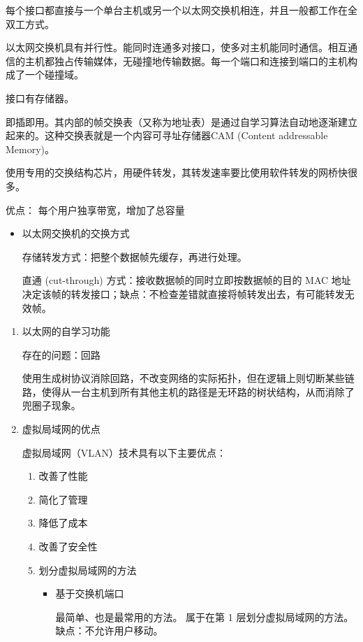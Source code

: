 \documentclass[11pt]{article}
\begin{document}
\begin{enumerate}
\begin{enumerate}
每个接口都直接与一个单台主机或另一个以太网交换机相连，并且一般都工作在全双工方式。

以太网交换机具有并行性。能同时连通多对接口，使多对主机能同时通信。相互通信的主机都独占传输媒体，无碰撞地传输数据。每一个端口和连接到端口的主机构成了一个碰撞域。

接口有存储器。

即插即用。其内部的帧交换表（又称为地址表）是通过自学习算法自动地逐渐建立起来的。这种交换表就是一个内容可寻址存储器CAM (Content addressable Memory)。

使用专用的交换结构芯片，用硬件转发，其转发速率要比使用软件转发的网桥快很多。

优点：
每个用户独享带宽，增加了总容量

\begin{itemize}
\item 以太网交换机的交换方式

存储转发方式：把整个数据帧先缓存，再进行处理。

直通 (cut-through) 方式：接收数据帧的同时立即按数据帧的目的 MAC 地址决定该帧的转发接口；缺点：不检查差错就直接将帧转发出去，有可能转发无效帧。
\end{itemize}

\begin{enumerate}
\item 以太网的自学习功能
\label{sec:org642528f}

存在的问题：回路

使用生成树协议消除回路，不改变网络的实际拓扑，但在逻辑上则切断某些链路，使得从一台主机到所有其他主机的路径是无环路的树状结构，从而消除了兜圈子现象。

\item 虚拟局域网的优点
\label{sec:org9105e33}

虚拟局域网（VLAN）技术具有以下主要优点：

\begin{enumerate}
\item 改善了性能

\item 简化了管理

\item 降低了成本

\item 改善了安全性

\item 划分虚拟局域网的方法
\begin{itemize}
\item 基于交换机端口

最简单、也是最常用的方法。
属于在第 1 层划分虚拟局域网的方法。
缺点：不允许用户移动。


\end{itemize}
\end{enumerate}
\end{enumerate}
\end{enumerate}
\end{enumerate}
\end{document}
